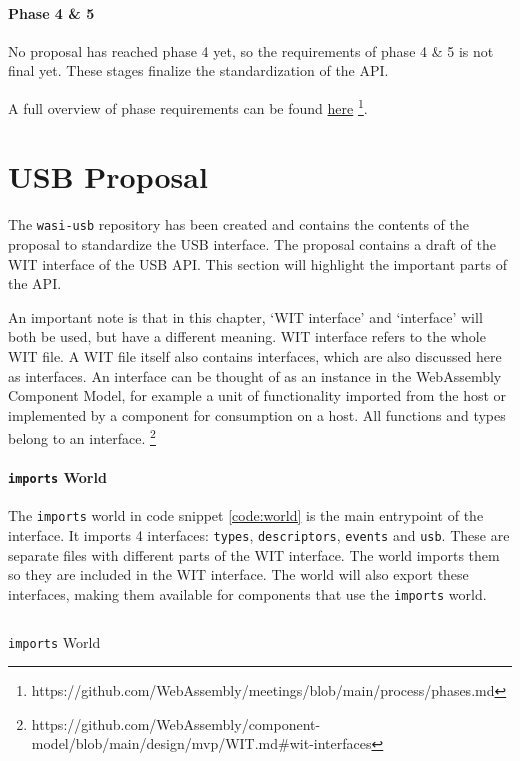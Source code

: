 \paragraph{Phase 4 \& 5}

No proposal has reached phase 4 yet, so the requirements of phase 4 \& 5 is not final yet. These stages finalize the standardization of the API.


A full overview of phase requirements can be found \href{https://github.com/WebAssembly/meetings/blob/main/process/phases.md}{here} \footnote{https://github.com/WebAssembly/meetings/blob/main/process/phases.md}.

\section{USB Proposal}
\label{section:usb_proposal}
The \texttt{wasi-usb} repository \cite{wasi_usb} has been created and contains the contents of the proposal to standardize the USB interface. The proposal contains a draft of the \acrshort{WIT} interface of the USB API. This section will highlight the important parts of the API.

An important note is that in this chapter, `WIT interface' and `interface' will both be used, but have a different meaning.
WIT interface refers to the whole WIT file.
A WIT file itself also contains interfaces, which are also discussed here as interfaces. An interface can be thought of as an instance in the WebAssembly Component Model, for example a unit of functionality imported from the host or implemented by a component for consumption on a host. All functions and types belong to an interface. \footnote{https://github.com/WebAssembly/component-model/blob/main/design/mvp/WIT.md\#wit-interfaces}

\paragraph{\texttt{imports} World}
The \texttt{imports} world in code snippet \ref{code:world} is the main entrypoint of the interface. It imports 4 interfaces: \texttt{types}, \texttt{descriptors}, \texttt{events} and \texttt{usb}. These are separate files with different parts of the WIT interface. The world imports them so they are included in the WIT interface. The world will also export these interfaces, making them available for components that use the \texttt{imports} world.\\

\begin{code}
\inputminted[breaklines]{text}{WIT/wit/world.wit}
\caption{\texttt{imports} World}
\label{code:world}
\end{code}

